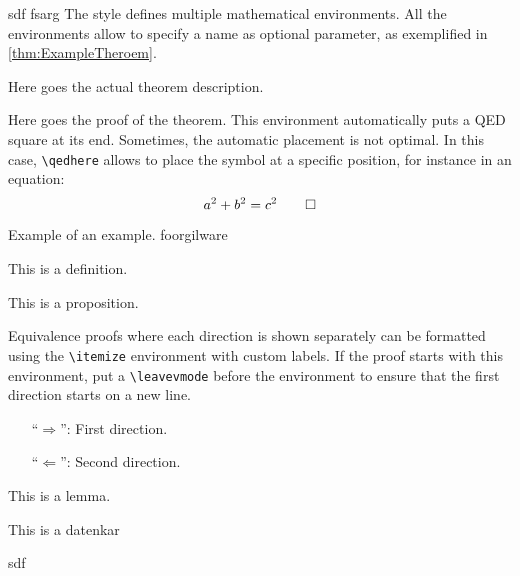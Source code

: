 sdf
fsarg
The style defines multiple mathematical environments. All the environments allow to specify a name as optional parameter, as exemplified in \cref{thm:ExampleTheroem}.
\begin{Thm}
\label{thm:ExampleTheroem}
Here goes the actual theorem description.
\end{Thm}
\begin{Proof}
Here goes the proof of the theorem. This environment automatically puts a QED square at its end. Sometimes, the automatic placement is not optimal. In this case, \texttt{\textbackslash qedhere} allows to place the symbol at a specific position, for instance in an equation:
\[a^2+b^2=c^2\qedhere\]
\end{Proof}
\begin{Exp}Example of an example. foorgilware
\end{Exp}
\begin{Def}This is a definition.
\end{Def}
\begin{Prop}This is a proposition.
\end{Prop}
Equivalence proofs where each direction is shown separately can be formatted using the \texttt{\textbackslash itemize} environment with custom labels. If the proof starts with this environment, put a \texttt{\textbackslash leavevmode} before the environment to ensure that the first direction starts on a new line.
\begin{Proof}\leavevmode
\begin{itemize}[beginpenalty=10000,leftmargin=7ex]
\item[\enquote{$\Rightarrow$}:] First direction.
\item[\enquote{$\Leftarrow$}:] Second direction.\qedhere
\end{itemize}
\end{Proof}

\begin{Lem}This is a lemma.
\end{Lem}
\begin{Cor}This is a datenkar
\end{Cor}



\begin{procedure}
    sdf
\end{procedure}
\begin{problem}
    
\end{problem}